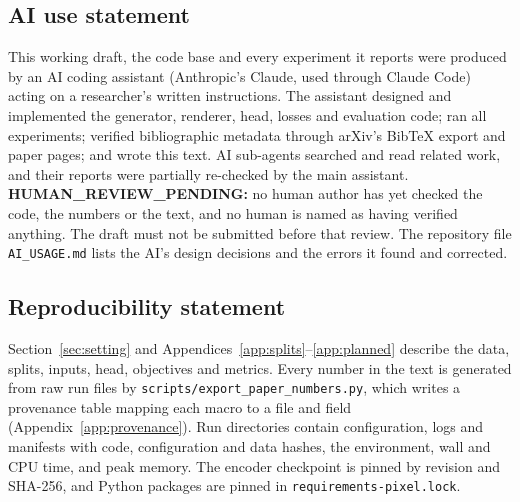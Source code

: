 \subsection*{AI use statement}
This working draft, the code base and every experiment it reports were produced by an AI coding
assistant (Anthropic's Claude, used through Claude Code) acting on a researcher's written
instructions. The assistant designed and implemented the generator, renderer, head, losses and
evaluation code; ran all experiments; verified bibliographic metadata through arXiv's BibTeX export
and paper pages; and wrote this text. AI sub-agents searched and read related work, and their
reports were partially re-checked by the main assistant. \textbf{HUMAN\_REVIEW\_PENDING:} no human
author has yet checked the code, the numbers or the text, and no human is named as having verified
anything. The draft must not be submitted before that review. The repository file
\texttt{AI\_USAGE.md} lists the AI's design decisions and the errors it found and corrected.

\subsection*{Reproducibility statement}
Section~\ref{sec:setting} and Appendices~\ref{app:splits}--\ref{app:planned} describe the data,
splits, inputs, head, objectives and metrics. Every number in the text is generated from raw run
files by \texttt{scripts/export\_paper\_numbers.py}, which writes a provenance table mapping each
macro to a file and field (Appendix~\ref{app:provenance}). Run directories contain configuration,
logs and manifests with code, configuration and data hashes, the environment, wall and CPU time,
and peak memory. The encoder checkpoint is pinned by revision and SHA-256, and Python packages are
pinned in \texttt{requirements-pixel.lock}.
